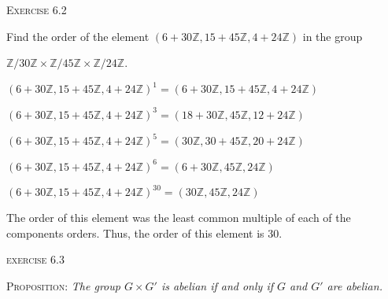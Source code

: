 \documentclass[12pt, a4paper]{article}
\begin{document}
\vspace{6mm}

\begin{flushleft}
\textsc{Exercise 6.2}
\end{flushleft}

    Find the order of the element $(6+30\mathbb{Z}, 15+45\mathbb{Z}, 4+24\mathbb{Z})$ in the group\par $\mathbb{Z}/30\mathbb{Z}\times\mathbb{Z}/45\mathbb{Z}\times\mathbb{Z}/24\mathbb{Z}$.
    
\vspace{6mm}

    \hspace{21mm}$(6+30\mathbb{Z}, 15+45\mathbb{Z}, 4+24\mathbb{Z})^1=(6+30\mathbb{Z}, 15+45\mathbb{Z}, 4+24\mathbb{Z})$
    
\vspace{2mm}

    \centerline{$(6+30\mathbb{Z}, 15+45\mathbb{Z}, 4+24\mathbb{Z})^3=(18+30\mathbb{Z}, 45\mathbb{Z}, 12+24\mathbb{Z})$}
    
\vspace{2mm}

    \centerline{$(6+30\mathbb{Z}, 15+45\mathbb{Z}, 4+24\mathbb{Z})^5=(30\mathbb{Z}, 30+45\mathbb{Z}, 20+24\mathbb{Z})$}
    
\vspace{2mm}

    \hspace{20mm}
    $(6+30\mathbb{Z}, 15+45\mathbb{Z}, 4+24\mathbb{Z})^6=(6+30\mathbb{Z}, 45\mathbb{Z}, 24\mathbb{Z})$
    
\vspace{2mm}

    \hspace{21mm}$(6+30\mathbb{Z}, 15+45\mathbb{Z}, 4+24\mathbb{Z})^{30}=(30\mathbb{Z}, 45\mathbb{Z}, 24\mathbb{Z})$
    
\vspace{6mm}

    The order of this element was the least common multiple of each of the components orders. Thus, the order of this element is 30.
    

\newpage

\begin{flushleft}
\textsc{exercise 6.3}
\end{flushleft}

    \textsc{Proposition: }\textit{The group $G\times G'$ is abelian if and only if $G$ and $G'$ are abelian.}
    
\end{document}
